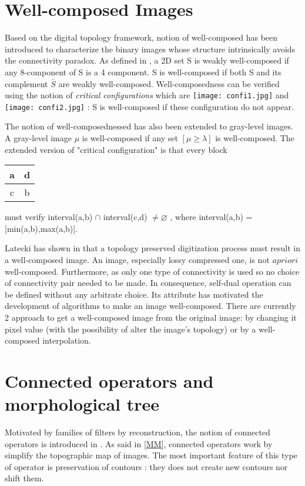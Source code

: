 \section{Well-composed Images} \label{Wellcomposed}
Based on the digital topology framework, notion of well-composed has been introduced to characterize the binary images whose structure intrinsically avoids the connectivity paradox. As defined in \cite{Latecki95}, a 2D set S is weakly well-composed if any 8-component of S is a 4 component. S is well-composed if both S and its complement $\bar{S}$ are weakly well-composed. Well-composedness can be verified  using the notion of \textit{critical configurations} which are \texttt{[image: confi1.jpg]} and \texttt{[image: confi2.jpg]} : S is well-composed if these configuration do not appear. 
\par
The notion of well-composednessed has also been extended to gray-level images. A gray-level image $\mu$ is well-composed if any set $[\mu \geq \lambda ]$ is well-composed. The extended version of "critical configuration" is that every block 
\begin{tabular}{|c|c|}
\hline 
a & d \\ 
\hline 
c & b \\ 
\hline 
\end{tabular} 
must verify interval(a,b) $\cap$ interval(c,d) $\neq \varnothing$ , where interval(a,b) = [min(a,b),max(a,b)].
\par
Latecki has shown in \cite{Latecki.98.JMIV} that a topology preserved digitization process must result in a well-composed image. An image, especially lossy compressed one, is not $a priori$ well-composed. Furthermore, as only one type of connectivity is used so no choice of connectivity pair needed to be made. In consequence, self-dual operation can be defined without any arbitrate choice. Its attribute has motivated the development of algorithms to make an image well-composed. There are currently 2 approach to get a well-composed image from the original image: by changing it pixel value (with the possibility of alter the image's topology) or by a well-composed interpolation.


\section{Connected operators and morphological tree}
Motivated by families of filters by reconstruction, the notion of connected operators is introduced in \cite{Salembier95flatzones} \cite{Serra1993}. As said in \ref{MM}, connected operators work by simplify the topographic map of images. The most important feature of this type of operator is preservation of contours \cite{Salembier2009}: they does not create new contours nor shift them. 
